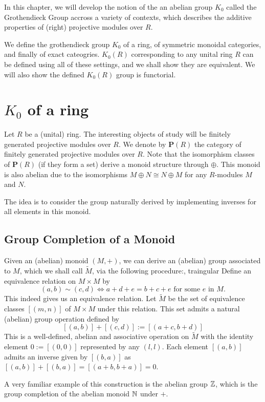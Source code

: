 In this chapter, we will develop the notion of the an abelian group $K_0$ called the Grothendieck Group 
accross a variety of contexts, which describes the additive properties of (right) projective modules over $R$. 

We define the grothendieck group $K_0$ of a ring, of symmetric monoidal categories, and finally of exact cateogries.
$K_0(R)$ corresponding to any unital ring $R$ can be defined using all of these settings,
and we shall show they are equivalent.
We will also show the defined $K_0(R)$ group is functorial.

\section{$K_0$ of a ring}
Let $R$ be a (unital) ring. The interesting objects of study will be finitely generated projective modules over $R$.
We denote by $\mathbf{P}(R)$ the category of finitely generated projective modules over $R$.
Note that the isomorphism classes of $\mathbf{P}(R)$ (if they form a set) derive a monoid structure through $\oplus$.
This monoid is also abelian due to the isomorphisms $M \oplus N \cong N \oplus M$ for any $R$-modules $M$ and $N$.

The idea is to consider the group naturally derived by implementing inverses for all elements in this monoid.

\subsection{Group Completion of a Monoid}
Given an (abelian) monoid $(M, +)$, we can derive an (abelian) group associated to $M$, which we shall call $\tilde{M}$, via the following procedure:, traingular 
Define an equivalence relation on $M \times M$ by 
\[(a,b) \sim (c,d) \Leftrightarrow  a + d + e = b + c + e \text{ for some $e$ in $M$.} \]
This indeed gives us an equivalence relation.
Let $\widetilde{M}$ be the set of equivalence classes $[(m,n)]$ of $M \times M$ under this relation. This set admits a natural (abelian) group operation defined by
\[
  [(a,b)] + [(c,d)] := [(a+c,b+d)]
\]
This is a well-defined, abelian and associative operation on $\widetilde{M}$ with the identity element $0 := [(0,0)]$ represented by any $(l,l)$. 
Each element $[(a,b)]$ admits an inverse given by $[(b,a)]$ as $[(a,b)]+[(b,a)]=[(a+b,b+a)] = 0$. 

A very familiar example of this construction is the abelian group $\mathbb{Z}$, which is the group completion of the abelian monoid $\mathbb{N}$ under $+$.

